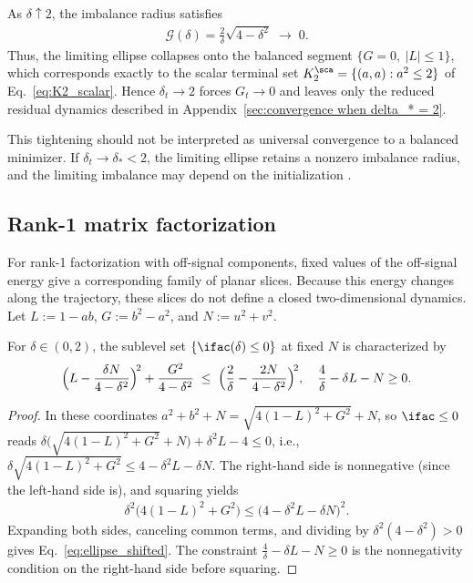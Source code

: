 \documentclass{article}
\begin{document}
As $\delta \uparrow 2$, the imbalance radius satisfies
\begin{align}
    \mathcal{G}(\delta) = \frac{2}{\delta}\sqrt{4-\delta^2} \;\longrightarrow\; 0.
\end{align}
Thus, the limiting ellipse collapses onto the balanced segment
$\{G = 0,\ |L|\le 1\}$, which corresponds exactly to the scalar terminal set
$K_2^\sca = \{(a,a) : a^2 \le 2\}$ of
Eq.~\eqref{eq:K2_scalar}. Hence $\delta_t\to2$ forces
$G_t\to0$ and leaves only the reduced residual dynamics described in
Appendix~\ref{sec:convergence when delta_* = 2}.

This tightening should not be interpreted as universal convergence to a
balanced minimizer. If $\delta_t\to\delta_\ast<2$, the limiting ellipse retains
a nonzero imbalance radius, and the limiting imbalance may depend on the
initialization \citep{liang2025gradient}.

\subsection{Rank-1 matrix factorization}
\label{subsec:LG_rank1}
For rank-1 factorization with off-signal components, fixed values of the
off-signal energy give a corresponding family of planar slices. Because this
energy changes along the trajectory, these slices do not define a closed
two-dimensional dynamics.
Let $L := 1 - ab$, $G := b^2 - a^2$, and $N := u^2 + v^2$.

\begin{proposition}\label{prop:shifted_ellipse}
For $\delta \in (0,2)$, the sublevel set $\{\ifac(\delta) \le 0\}$ at fixed $N$
is characterized by
\begin{align}
    \Bigl(L - \frac{\delta N}{4-\delta^2}\Bigr)^{\!2}
    + \frac{G^2}{4-\delta^2}
    \;\le\;
    \Bigl(\frac{2}{\delta} - \frac{2N}{4-\delta^2}\Bigr)^{\!2},
    \quad
    \frac{4}{\delta} - \delta L - N \ge 0.
    \label{eq:ellipse_shifted}
\end{align}
\end{proposition}
\begin{proof}
In these coordinates $a^2 + b^2 + N = \sqrt{4(1-L)^2 + G^2} + N$, so
$\ifac \le 0$ reads
$\delta\bigl(\sqrt{4(1-L)^2 + G^2} + N\bigr) + \delta^2 L - 4 \le 0$, i.e.,
$\delta\sqrt{4(1-L)^2 + G^2} \le 4 - \delta^2 L - \delta N$.
The right-hand side is nonnegative (since the left-hand side is), and
squaring yields
\begin{align}
    \delta^2\bigl(4(1-L)^2 + G^2\bigr)
    \le \bigl(4 - \delta^2 L - \delta N\bigr)^2.
\end{align}
Expanding both sides, canceling common terms, and dividing by
$\delta^2 (4-\delta^2) > 0$ gives Eq.~\eqref{eq:ellipse_shifted}.
The constraint $\frac{4}{\delta} - \delta L - N \ge 0$ is the nonnegativity
condition on the right-hand side before squaring.
\end{proof}
\end{document}
